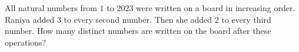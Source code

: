 All natural numbers from $1$ to $2023$ were written on a board in increasing order. Raniya added $3$ to every second number. Then she added $2$ to every third number. How many distinct numbers are written on the board after these operations?
